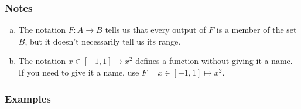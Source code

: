 \documentclass[12pt]{article}
\newenvironment{alphalist}{
  \begin{enumerate}[(a)]
    \addtolength{\itemsep}{-0.5\itemsep}}
  {\end{enumerate}}
\begin{document}
\subsubsection*{Notes}

\begin{alphalist}
  \item The notation $F : A \to B$ tells us that every output of $F$ is
  a member of the set $B$, but it doesn't necessarily tell us its range. 

    \item The notation $x \in [-1,1] \mapsto x^2$ defines a function without
    giving it a name. If you need to give it a name, use
    $ F = x \in [-1,1] \mapsto x^2$.
  
\end{alphalist}
\subsubsection*{Examples}
\end{document}
